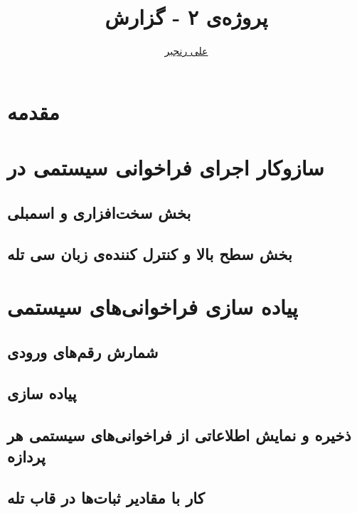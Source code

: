 \documentclass[logo=images/logo.png]{tehranReport}
\title{پروژه‌ی ۲ - گزارش}
\author{\href{mailto:ranjbar.ali@ut.ac.ir?subject=[OS\%20S99 L1]\%20}{علی رنجبر}}
\begin{document}
	\maketitlepage
	\section*{مقدمه}
	
	

	\section*{سازوکار اجرای فراخوانی سیستمی در }
	\subsection*{بخش سخت‌افزاری و اسمبلی}
	
	
	\subsection*{بخش سطح بالا و کنترل کننده‌ی زبان سی تله}
	
	\section*{پیاده سازی فراخوانی‌های سیستمی}
	\subsection*{شمارش رقم‌های ورودی}
	
	\subsection*{پیاده سازی }
	
	\subsection*{ذخیره و نمایش اطلاعاتی از فراخوانی‌های سیستمی هر پردازه}
	
	\subsection*{کار با مقادیر ثبات‌ها در قاب تله}
	
	
\end{document}
